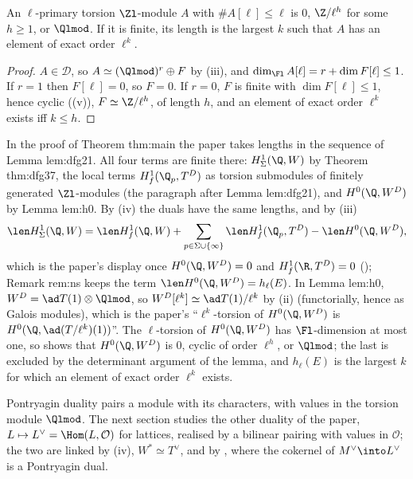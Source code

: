 \begin{corollary}\label{cor:modules:cyclic-l-primary}
An $\ell$-primary torsion $\Zl$-module $A$ with $\#A[\ell]\le\ell$ is $0$, $\Z/\ell^h$ for some $h\ge1$, or $\Qlmod$. If it is finite, its length is the largest
$k$ such that $A$ has an element of exact order $\ell^k$.
\end{corollary}

\begin{proof}
$A\in\mathcal D$, so $A\simeq(\Qlmod)^r\oplus F$ by (iii), and $\dim_{\Fl}A[\ell]=r+\dim F[\ell]\le1$. If $r=1$ then $F[\ell]=0$, so $F=0$.
If $r=0$, $F$ is finite with $\dim F[\ell]\le1$, hence cyclic ((v)), $F\simeq\Z/\ell^h$, of length $h$, and an element of exact
order $\ell^k$ exists iff $k\le h$.
\end{proof}

\begin{paperlink}\label{pl:modules:dfg21}
In the proof of Theorem thm:main the paper takes lengths in the sequence of Lemma lem:dfg21. All four terms are finite there:
$H^1_\Sigma(\Q,W)$ by Theorem thm:dfg37, the local terms $H^1_f(\Q_p,T^D)$ as torsion submodules of finitely generated $\Zl$-modules (the
paragraph after Lemma lem:dfg21), and $H^0(\Q,W^D)$ by Lemma lem:h0. By (iv) the duals have the same lengths, and by
(iii)
\[
\len H^1_\Sigma(\Q,W)=\len H^1_f(\Q,W)+\sum_{p\in\Sigma\cup\{\infty\}}\len H^1_f(\Q_p,T^D)-\len H^0(\Q,W^D),
\]
which is the paper's display once $H^0(\Q,W^D)=0$ and $H^1_f(\R,T^D)=0$ (); Remark rem:ns keeps the term
$\len H^0(\Q,W^D)=h_\ell(E)$. In Lemma lem:h0, $W^D=\ad T(1)\otimes\Qlmod$, so $W^D[\ell^k]\simeq\ad T(1)/\ell^k$ by (ii)
(functorially, hence as Galois modules), which is the paper's ``$\ell^k$-torsion of $H^0(\Q,W^D)$ is $H^0(\Q,\ad(T/\ell^k)(1))$''. The $\ell$-torsion of
$H^0(\Q,W^D)$ has $\Fl$-dimension at most one, so  shows that $H^0(\Q,W^D)$ is $0$, cyclic of order $\ell^h$, or
$\Qlmod$; the last is excluded by the determinant argument of the lemma, and $h_\ell(E)$ is the largest $k$ for which an element of exact order $\ell^k$
exists.
\end{paperlink}

Pontryagin duality pairs a module with its characters, with values in the torsion module $\Qlmod$. The next section studies the other duality
of the paper, $L\mapsto L^\vee=\Hom(L,\mathcal O)$ for lattices, realised by a bilinear pairing with values in $\mathcal O$; the two are linked by
(iv), $W^*\simeq T^\vee$, and by , where the cokernel of $M^\vee\into L^\vee$ is a Pontryagin dual.

